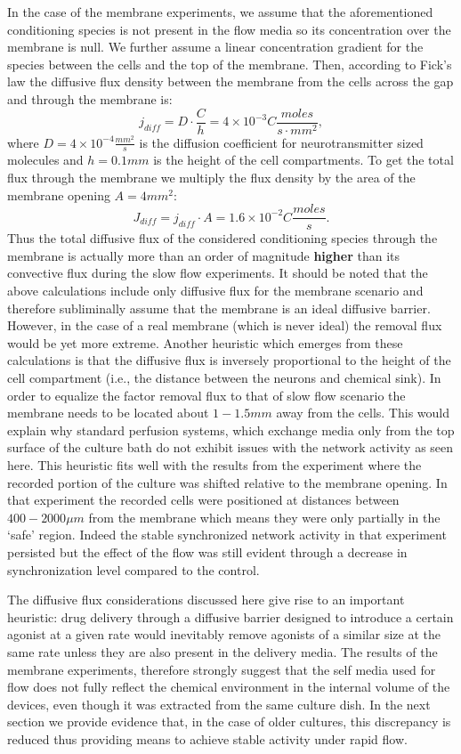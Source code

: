         In the case of the membrane experiments, we assume that the aforementioned conditioning species is not present in the flow media so its concentration over the membrane is null. We further assume a linear concentration gradient for the species between the cells and the top of the membrane. Then, according to Fick's law the diffusive flux density between the membrane from the cells across the gap and through the membrane is: \[j_{diff}=D\cdot\frac{C}{h}=4\times 10^{-3}C \frac{moles}{s\cdot mm^{2}},\] where \(D=4\times 10^{-4}\frac{mm^2}{s}\) is the diffusion coefficient for neurotransmitter sized molecules and \(h=0.1 mm\) is the height of the cell compartments. To get the total flux through the membrane we multiply the flux density by the area of the membrane opening \(A=4 mm^{2}\): \[J_{diff}=j_{diff}\cdot A=1.6\times 10^{-2}C\frac{moles}{s}.\] Thus the total diffusive flux of the considered conditioning species through the membrane is actually more than an order of magnitude \textbf{higher} than its convective flux during the slow flow experiments. It should be noted that the above calculations include only diffusive flux for the membrane scenario and therefore subliminally assume that the membrane is an ideal diffusive barrier. However, in the case of a real membrane (which is never ideal) the removal flux would be yet more extreme. Another heuristic which emerges from these calculations is that the diffusive flux is inversely proportional to the height of the cell compartment (i.e., the distance between the neurons and chemical sink). In order to equalize the factor removal flux to that of slow flow scenario the membrane needs to be located about \(1-1.5 mm\) away from the cells. This would explain why standard perfusion systems, which exchange media only from the top surface of the culture bath do not exhibit issues with the network activity as seen here. This heuristic fits well with the results from the experiment where the recorded portion of the culture was shifted relative to the membrane opening. In that experiment the recorded cells were positioned at distances between \(400-2000\mu m\) from the membrane which means they were only partially in the `safe' region. Indeed the stable synchronized network activity in that experiment persisted but the effect of the flow was still evident through a decrease in synchronization level compared to the control.

        The diffusive flux considerations discussed here give rise to an important heuristic: drug delivery through a diffusive barrier designed to introduce a certain agonist at a given rate would inevitably remove agonists of a similar size at the same rate unless they are also present in the delivery media. The results of the membrane experiments, therefore strongly suggest that the self media used for flow does not fully reflect the chemical environment in the internal volume of the devices, even though it was extracted from the same culture dish. In the next section we provide evidence that, in the case of older cultures, this discrepancy is reduced thus providing means to achieve stable activity under rapid flow.

